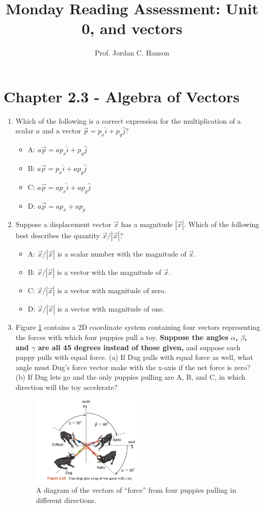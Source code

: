 \documentclass{article}
\begin{document}
\title{Monday Reading Assessment: Unit 0, and vectors}
\author{Prof. Jordan C. Hanson}

\maketitle

\section{Chapter 2.3 - Algebra of Vectors}

\begin{enumerate}
\item Which of the following is a correct expression for the multiplication of a scalar $a$ and a vector $\vec{p} = p_x \hat{i} + p_y \hat{j}$?
\begin{itemize}
\item A: $a\vec{p} = a p_x \hat{i} + p_y \hat{j}$
\item B: $a\vec{p} = p_x \hat{i} + a p_y \hat{j}$
\item C: $a\vec{p} = a p_x \hat{i} + a p_y \hat{j}$
\item D: $a\vec{p} = a p_x + a p_y$
\end{itemize}
\item Suppose a displacement vector $\vec{x}$ has a magnitude $|\vec{x}|$.  Which of the following best describes the quantity $\vec{x}/|\vec{x}|$?
\begin{itemize}
\item A: $\vec{x}/|\vec{x}|$ is a scalar number with the magnitude of $\vec{x}$.
\item B: $\vec{x}/|\vec{x}|$ is a vector with the magnitude of $\vec{x}$.
\item C: $\vec{x}/|\vec{x}|$ is a vector with magnitude of zero.
\item D: $\vec{x}/|\vec{x}|$ is a vector with magnitude of one.
\end{itemize}
\item Figure \ref{fig:puppies} contains a 2D coordinate system containing four vectors representing the forces with which four puppies pull a toy.  \textbf{Suppose the angles $\alpha$, $\beta$, and $\gamma$ are all 45 degrees instead of those given,} and suppose each puppy pulls with equal force.  (a) If Dug pulls with equal force as well, what angle must Dug's force vector make with the x-axis if the net force is zero?  (b) If Dug lets go and the only puppies pulling are A, B, and C, in which direction will the toy accelerate?
\begin{figure}[hb]
\center
\includegraphics[width=0.5\textwidth]{figures/puppies.png}
\caption{\label{fig:puppies} A diagram of the vectors of ``force'' from four puppies pulling in different directions.}
\end{figure}
\end{enumerate}
\end{document}
